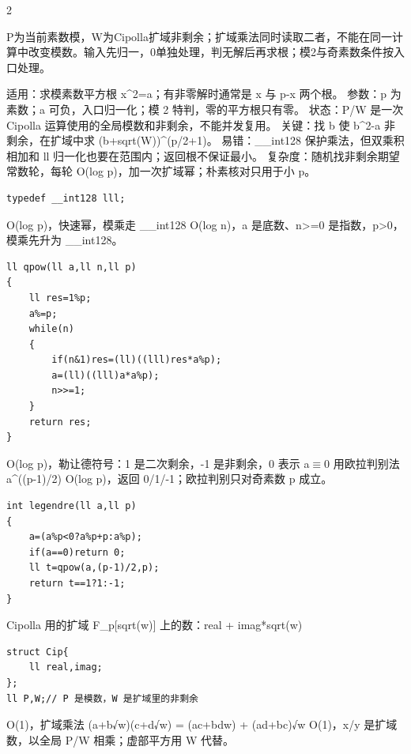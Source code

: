 \documentclass[UTF8,fontset=fandol,a4paper,twoside]{ctexart}
\newcommand{\note}[1]{{\fontsize{10}{12}\selectfont #1\par}}
\begin{document}
\begin{multicols}{2}
\note{P为当前素数模，W为Cipolla扩域非剩余；扩域乘法同时读取二者，不能在同一计算中改变模数。输入先归一，0单独处理，判无解后再求根；模2与奇素数条件按入口处理。}
\note{适用：求模素数平方根 x\textasciicircum{}2=\allowbreak{}a；有非零解时通常是 x 与 p-\allowbreak{}x 两个根。 参数：p 为素数；a 可负，入口归一化；模 2 特判，零的平方根只有零。 状态：P/\allowbreak{}W 是一次 Cipolla 运算使用的全局模数和非剩余，不能并发复用。 关键：找 b 使 b\textasciicircum{}2-\allowbreak{}a 非剩余，在扩域中求 (\allowbreak{}b+\allowbreak{}sqrt(\allowbreak{}W)\allowbreak{})\allowbreak{}\textasciicircum{}(\allowbreak{}p/\allowbreak{}2+\allowbreak{}1)\allowbreak{}。 易错：\_\_int128 保护乘法，但双乘积相加和 ll 归一化也要在范围内；返回根不保证最小。 复杂度：随机找非剩余期望常数轮，每轮 O(\allowbreak{}log p)\allowbreak{}，加一次扩域幂；朴素核对只用于小 p。}
\begin{lstlisting}
typedef __int128 lll;
\end{lstlisting}
\note{O(\allowbreak{}log p)\allowbreak{}，快速幂，模乘走 \_\_int128 O(\allowbreak{}log n)\allowbreak{}，a 是底数、n>\allowbreak{}=\allowbreak{}0 是指数，p>\allowbreak{}0，模乘先升为 \_\_int128。}
\begin{lstlisting}
ll qpow(ll a,ll n,ll p)
{
    ll res=1%p;
    a%=p;
    while(n)
    {
        if(n&1)res=(ll)((lll)res*a%p);
        a=(ll)((lll)a*a%p);
        n>>=1;
    }
    return res;
}
\end{lstlisting}
\note{O(\allowbreak{}log p)\allowbreak{}，勒让德符号：1 是二次剩余，-\allowbreak{}1 是非剩余，0 表示 a\ensuremath{\equiv}0 用欧拉判别法 a\textasciicircum{}(\allowbreak{}(\allowbreak{}p-\allowbreak{}1)\allowbreak{}/\allowbreak{}2)\allowbreak{} O(\allowbreak{}log p)\allowbreak{}，返回 0/\allowbreak{}1/\allowbreak{}-\allowbreak{}1；欧拉判别只对奇素数 p 成立。}
\begin{lstlisting}
int legendre(ll a,ll p)
{
    a=(a%p<0?a%p+p:a%p);
    if(a==0)return 0;
    ll t=qpow(a,(p-1)/2,p);
    return t==1?1:-1;
}
\end{lstlisting}
\note{Cipolla 用的扩域 F\_p[\allowbreak{}sqrt(\allowbreak{}w)\allowbreak{}]\allowbreak{} 上的数：real +\allowbreak{} imag*sqrt(\allowbreak{}w)\allowbreak{}}
\begin{lstlisting}
struct Cip{
    ll real,imag;
};
ll P,W;// P 是模数，W 是扩域里的非剩余
\end{lstlisting}
\note{O(\allowbreak{}1)\allowbreak{}，扩域乘法 (\allowbreak{}a+\allowbreak{}b√w)\allowbreak{}(\allowbreak{}c+\allowbreak{}d√w)\allowbreak{} =\allowbreak{} (\allowbreak{}ac+\allowbreak{}bdw)\allowbreak{} +\allowbreak{} (\allowbreak{}ad+\allowbreak{}bc)\allowbreak{}√w O(\allowbreak{}1)\allowbreak{}，x/\allowbreak{}y 是扩域数，以全局 P/\allowbreak{}W 相乘；虚部平方用 W 代替。}

\end{multicols}
\end{document}
